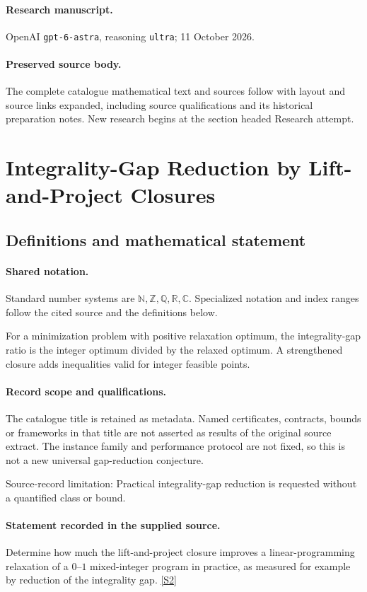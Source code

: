 \documentclass[11pt]{article}
\begin{document}
\paragraph{Research manuscript.} OpenAI \texttt{gpt-6-astra}, reasoning \texttt{ultra}; 11 October 2026.
\paragraph{Preserved source body.} The complete catalogue mathematical text and sources follow with layout and source links expanded, including source qualifications and its historical preparation notes. New research begins at the section headed Research attempt.

\section{Integrality-Gap Reduction by Lift-and-Project Closures}\label{statement}

\subsection{Definitions and mathematical statement}

\paragraph{Shared notation.}Standard number systems are $\mathbb N,\mathbb Z,\mathbb Q,\mathbb R,\mathbb C$. Specialized notation and index ranges follow the cited source and the definitions below.


For a minimization problem with positive relaxation optimum, the integrality-gap ratio is the integer optimum divided by the relaxed optimum. A strengthened closure adds inequalities valid for integer feasible points.
\paragraph{Record scope and qualifications.}
The catalogue title is retained as metadata. Named certificates, contracts, bounds or frameworks in that title are not asserted as results of the original source extract.
The instance family and performance protocol are not fixed, so this is not a new universal gap-reduction conjecture.

Source-record limitation: Practical integrality-gap reduction is requested without a quantified class or bound.
\paragraph{Statement recorded in the supplied source.}
Determine how much the lift-and-project closure improves a linear-programming relaxation of a $0$–$1$ mixed-integer program in practice, as measured for example by reduction of the integrality gap. \href{https://doi.org/10.4171/owr/2005/50}{[S2]}
\end{document}
